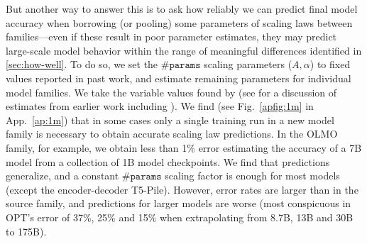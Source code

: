\documentclass{article}
\theoremstyle{plain}
\theoremstyle{definition}
\theoremstyle{remark}
\newcommand{\mathmsize}{\#\texttt{params}}
\newcommand{\msize}{$\mathmsize{}$}
\begin{document}
But another way to answer this is to ask how reliably we can predict final model accuracy when borrowing (or pooling) some parameters of scaling laws between families---even if these result in poor parameter estimates, they may predict large-scale model behavior within the range of meaningful differences identified in \cref{sec:how-well}.
To do so, we set the \msize{} scaling parameters ($A, \alpha$) to fixed values reported in past work, and estimate remaining parameters for individual model families.
We take the variable values found by \citet{datablations} 
(see 
\citealp{besiroglu2024chinchillascalingreplicationattempt,porian2024resolving} for a discussion of estimates from earlier work including
\citealp{hoffmann2022training}).
We find (see Fig.~\ref{apfig:1m} in App.~\ref{ap:1m}) that in some cases only a single training run in a new model family is necessary to obtain accurate scaling law predictions. In the OLMO family, for example, we obtain less than 1\% error estimating the accuracy of a 7B model from a collection of 1B model checkpoints. We find that predictions generalize, and a constant \msize{} scaling factor is enough for most models (except the encoder-decoder T5-Pile). However, error rates are larger than in the source family, and predictions for larger models are worse (most conspicuous in OPT's error of 37\%, 25\% and 15\% when extrapolating from 8.7B, 13B and 30B to 175B).
\end{document}
